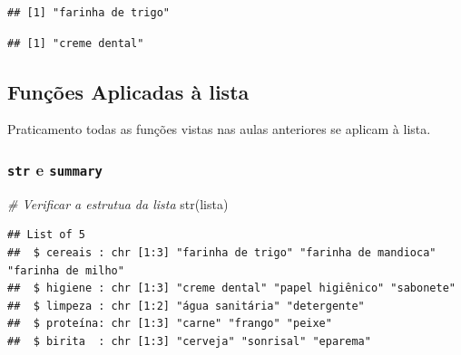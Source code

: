 \documentclass[
]{article}
\newenvironment{Shaded}{\begin{snugshade}}{\end{snugshade}}
\newcommand{\CommentTok}[1]{\textcolor[rgb]{0.56,0.35,0.01}{\textit{#1}}}
\newcommand{\DecValTok}[1]{\textcolor[rgb]{0.00,0.00,0.81}{#1}}
\newcommand{\FunctionTok}[1]{\textcolor[rgb]{0.00,0.00,0.00}{#1}}
\newcommand{\NormalTok}[1]{#1}
\newcommand{\SpecialCharTok}[1]{\textcolor[rgb]{0.00,0.00,0.00}{#1}}
\begin{document}
\begin{Shaded}
\end{Shaded}

\begin{verbatim}
## [1] "farinha de trigo"
\end{verbatim}

\begin{Shaded}
\end{Shaded}

\begin{verbatim}
## [1] "creme dental"
\end{verbatim}

\hypertarget{funuxe7uxf5es-aplicadas-uxe0-lista}{%
\subsection{Funções Aplicadas à
lista}\label{funuxe7uxf5es-aplicadas-uxe0-lista}}

Praticamento todas as funções vistas nas aulas anteriores se aplicam à
lista.

\hypertarget{str-e-summary}{%
\subsubsection{\texorpdfstring{\texttt{str} e
\texttt{summary}}{str e summary}}\label{str-e-summary}}

\begin{Shaded}
\begin{Highlighting}[]
\CommentTok{\# Verificar a estrutua da lista}
\FunctionTok{str}\NormalTok{(lista)}
\end{Highlighting}
\end{Shaded}

\begin{verbatim}
## List of 5
##  $ cereais : chr [1:3] "farinha de trigo" "farinha de mandioca" "farinha de milho"
##  $ higiene : chr [1:3] "creme dental" "papel higiênico" "sabonete"
##  $ limpeza : chr [1:2] "água sanitária" "detergente"
##  $ proteína: chr [1:3] "carne" "frango" "peixe"
##  $ birita  : chr [1:3] "cerveja" "sonrisal" "eparema"
\end{verbatim}
\end{document}
